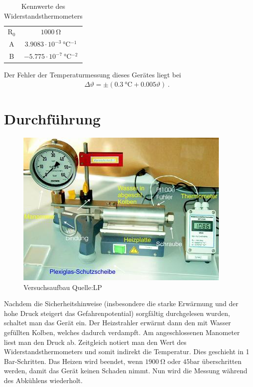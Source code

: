 \documentclass[12pt,a4paper,titlepage,headinclude,bibtotoc]{scrartcl}
\begin{document}
\begin{table}[!htb]
\centering
\begin{tabular}{|c|c|}
\hline
R$_0$ & $1000 ~ \si{\ohm}$\\
A   & $3.9083 \cdot 10^{-3} ~ \si{\celsius^{-1}}$\\
B   & $-5.775 \cdot 10^{-7} ~ \si{\celsius^{-2}}$\\
\hline
\end{tabular}
\caption{Kennwerte des Widerstandsthermometers}
\label{tab:Pt1000}
\end{table}

Der Fehler der Temperaturmessung dieses Gerätes liegt bei
\begin{align}
\Delta\vartheta=\pm (0.3~\si{\celsius}+0.005\vartheta)~.
\label{eq:Pt1000_fehler}
\end{align}


\section{Durchführung}
\label{sec:durchfuehrung}
\begin{figure}[!htb]
\centering
\includegraphics[scale=1.0]{Aufbau.jpg}
\caption{Versuchsaufbau Quelle:LP}	
\label{fig:Aufbau}
\end{figure}

Nachdem die Sicherheitshinweise (insbesondere die starke Erwärmung und der hohe Druck steigert das Gefahrenpotential) sorgfältig durchgelesen wurden, schaltet man das Gerät ein.
Der Heizstrahler erwärmt dann den mit Wasser gefüllten Kolben, welches dadurch verdampft.
Am angeschlossenen Manometer liest man den Druck ab.
Zeitgleich notiert man den Wert des Widerstandsthermometers und somit indirekt die Temperatur.
Dies geschieht in 1 Bar-Schritten.
Das Heizen wird beendet, wenn $1900 ~\si{\ohm}$ oder $45 \si{\bar}$ überschritten werden, damit das Gerät keinen Schaden nimmt.
Nun wird die Messung während des Abkühlens wiederholt.
\end{document}
